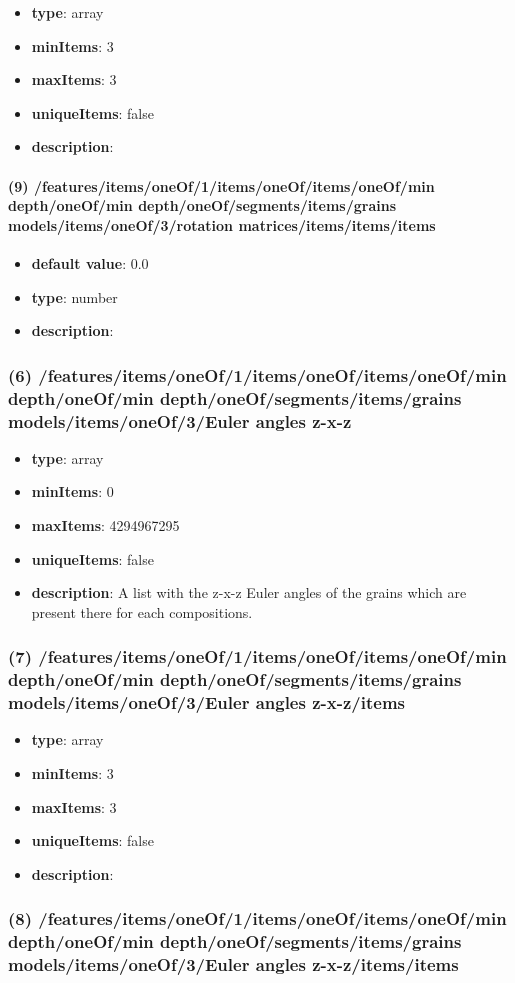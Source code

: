 \begin{itemize}[leftmargin=8em]\item {\bf type}: array
\item {\bf minItems}: 3
\item {\bf maxItems}: 3
\item {\bf uniqueItems}: false
\item {\bf description}: 
\end{itemize}\paragraph{(9) /features/items/oneOf/1/items/oneOf/items/oneOf/min depth/oneOf/min depth/oneOf/segments/items/grains models/items/oneOf/3/rotation matrices/items/items/items}
\begin{itemize}[leftmargin=9em]\item {\bf default value}: 0.0
\item {\bf type}: number
\item {\bf description}: 
\end{itemize}\subsubsection{(6) /features/items/oneOf/1/items/oneOf/items/oneOf/min depth/oneOf/min depth/oneOf/segments/items/grains models/items/oneOf/3/Euler angles z-x-z}
\begin{itemize}[leftmargin=6em]\item {\bf type}: array
\item {\bf minItems}: 0
\item {\bf maxItems}: 4294967295
\item {\bf uniqueItems}: false
\item {\bf description}: A list with the z-x-z Euler angles of the grains which are present there for each compositions.
\end{itemize}\subsubsection{(7) /features/items/oneOf/1/items/oneOf/items/oneOf/min depth/oneOf/min depth/oneOf/segments/items/grains models/items/oneOf/3/Euler angles z-x-z/items}
\begin{itemize}[leftmargin=7em]\item {\bf type}: array
\item {\bf minItems}: 3
\item {\bf maxItems}: 3
\item {\bf uniqueItems}: false
\item {\bf description}: 
\end{itemize}\subsubsection{(8) /features/items/oneOf/1/items/oneOf/items/oneOf/min depth/oneOf/min depth/oneOf/segments/items/grains models/items/oneOf/3/Euler angles z-x-z/items/items}
